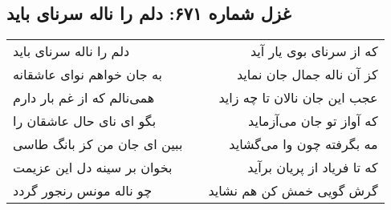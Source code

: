 \begin{center}
\section*{غزل شماره ۶۷۱: دلم را ناله سرنای باید}
\label{sec:0671}
\begin{longtable}{l p{0.5cm} r}
دلم را ناله سرنای باید
&&
که از سرنای بوی یار آید
\\
به جان خواهم نوای عاشقانه
&&
کز آن ناله جمال جان نماید
\\
همی‌نالم که از غم بار دارم
&&
عجب این جان نالان تا چه زاید
\\
بگو ای نای حال عاشقان را
&&
که آواز تو جان می‌آزماید
\\
ببین ای جان من کز بانگ طاسی
&&
مه بگرفته چون وا می‌گشاید
\\
بخوان بر سینه دل این عزیمت
&&
که تا فریاد از پریان برآید
\\
چو ناله مونس رنجور گردد
&&
گرش گویی خمش کن هم نشاید
\\
\end{longtable}
\end{center}
